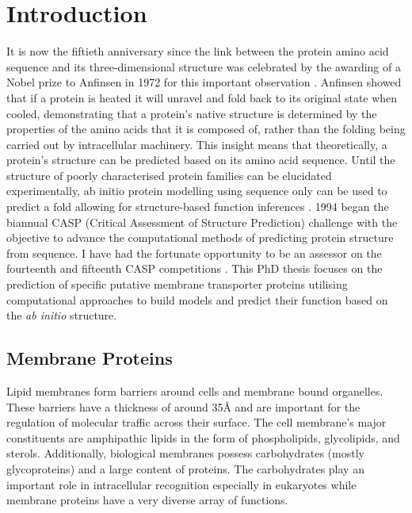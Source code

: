 \chapter{Introduction}
It is now the fiftieth anniversary since the link between the protein amino acid sequence and its three-dimensional structure was celebrated \cite{anfinsen1973principles} by the awarding of a Nobel prize to Anfinsen in 1972 for this important observation \cite{anfinsen1972nobel}.  Anfinsen showed that if a protein is heated it will unravel and fold back to its original state when cooled, demonstrating that a protein's native structure is determined by the properties of the amino acids that it is composed of, rather than the folding being carried out by intracellular machinery.  This insight means that theoretically, a protein's structure can be predicted based on its amino acid sequence.  Until the structure of poorly characterised protein families can be elucidated experimentally, ab initio protein modelling using sequence only can be used to predict a fold allowing for structure-based function inferences \cite{Rigden2017_a,rigden2017prediction,bandyopadhyay2006structure,da2012structure}.  1994 began the biannual CASP (Critical Assessment of Structure Prediction) challenge \cite{jones1999protein} with the objective to advance the computational methods of predicting protein structure from sequence. I have had the fortunate opportunity to be an assessor on the fourteenth and fifteenth CASP competitions \cite{simpkin2021evaluation}.  This PhD thesis focuses on the prediction of specific putative membrane transporter proteins utilising computational approaches to build models and predict their function based on the \textit{ab initio} structure. 

\section{Membrane Proteins}
Lipid membranes form barriers around cells and membrane bound organelles.  These barriers have a thickness of around 35{\AA} and are important for the regulation of molecular traffic across their surface.  The cell membrane's major constituents are amphipathic lipids in the form of phospholipids, glycolipids, and sterols.  Additionally, biological membranes possess  carbohydrates (mostly glycoproteins) and a large content of proteins.  The carbohydrates play an important role in intracellular recognition especially in eukaryotes while membrane proteins have a very diverse array of functions.

